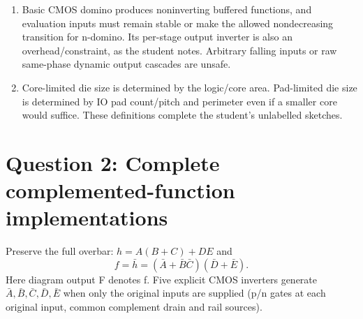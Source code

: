 \documentclass[10pt]{article}
\begin{document}
\begin{enumerate}[label=(\alph*)]
\item Basic CMOS domino produces noninverting buffered functions, and evaluation inputs must remain stable or make the allowed nondecreasing transition for n-domino. Its per-stage output inverter is also an overhead/constraint, as the student notes. Arbitrary falling inputs or raw same-phase dynamic output cascades are unsafe.
\item Core-limited die size is determined by the logic/core area. Pad-limited die size is determined by IO pad count/pitch and perimeter even if a smaller core would suffice. These definitions complete the student's unlabelled sketches.
\end{enumerate}

\newpage\section*{Question 2: Complete complemented-function implementations}
Preserve the full overbar: $h=A(B+C)+DE$ and
\[\boxed{f=\bar h=(\bar A+\bar B\bar C)(\bar D+\bar E).}\]
Here diagram output F denotes f. Five explicit CMOS inverters generate $\bar A,\bar B,\bar C,\bar D,\bar E$ when only the original inputs are supplied (p/n gates at each original input, common complement drain and rail sources).
\end{document}

